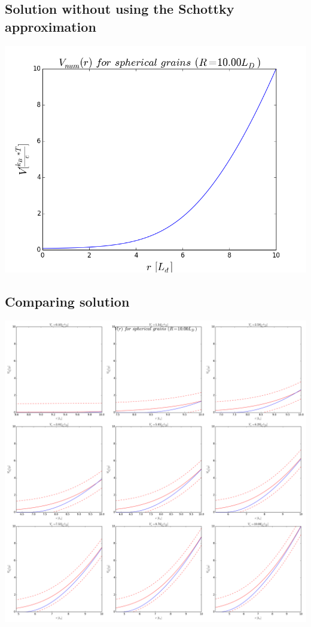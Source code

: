 \documentclass[10pt,a4paper]{article}
\begin{document}
\subsection{Solution without using the Schottky approximation}
\includegraphics[width=\textwidth]{png/numerical_10LD.png}
\subsection{Comparing solution}
\includegraphics[width=\textwidth]{png/compare_10LD.png} 







 
\end{document}
